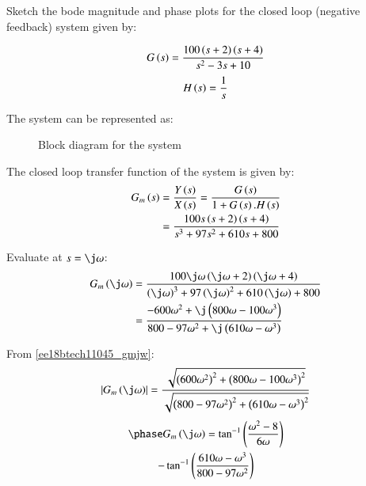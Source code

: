 
\item Sketch the bode magnitude and phase plots for the closed loop (negative feedback) system given by:

\begin{align}
    G\left(s\right) = \frac{100\left(s+2\right)\left(s+4\right)}{s^2 - 3s + 10}
    \label{ee18btech11045_gs}
\end{align}
\begin{align}
    H\left(s\right) = \frac{1}{s}
\end{align}

\solution
The system can be represented as:
\begin{figure}[!ht]
	\begin{center}
		\resizebox{\columnwidth}{!}{}
	\end{center}
\caption{Block diagram for the system}
\label{fig:ee18btech11045_1}
\end{figure}

The closed loop transfer function of the system is given by:
\begin{align}
    G_m\left(s\right) &= \frac{Y\left(s\right)}{X\left(s\right)} = \frac{G\left(s\right)}{1 + G\left(s\right).H\left(s\right)}
    \\
    &= \frac{100s\left(s+2\right)\left(s+4\right)}{s^3 + 97s^2 + 610s + 800}
    \label{ee18btech11045_gm}
\end{align}

Evaluate at $s = \j\omega$:
\begin{align}
    G_m\brak{\j\omega} &= \frac{100\j\omega\brak{\j\omega+2}\brak{\j\omega+4}}{\brak{\j\omega}^3 + 97\brak{\j\omega}^2 + 610\brak{\j\omega} + 800}
    \\
    &= \frac{-600\omega^2 + \j\brak{800\omega - 100\omega^3}}{800 - 97\omega^2 + \j\brak{610\omega - \omega^3}}
    \label{ee18btech11045_gmjw}
\end{align}

From \eqref{ee18btech11045_gmjw}:
\begin{align}
    \abs{G_m\brak{\j\omega}} = \frac{\sqrt{\brak{600\omega^2}^2 + \brak{800\omega-100\omega^3}^2}}{\sqrt{\brak{800 - 97\omega^2}^2+\brak{610\omega-\omega^3}^2}}
\end{align}
\begin{multline}
    \phase G_m\brak{\j\omega} = \tan^{-1}\brak{\frac{\omega^2 - 8}{6\omega}}
    \\-\tan^{-1}\brak{\frac{610\omega-\omega^3}{800-97\omega^2}}
\end{multline}    
    

